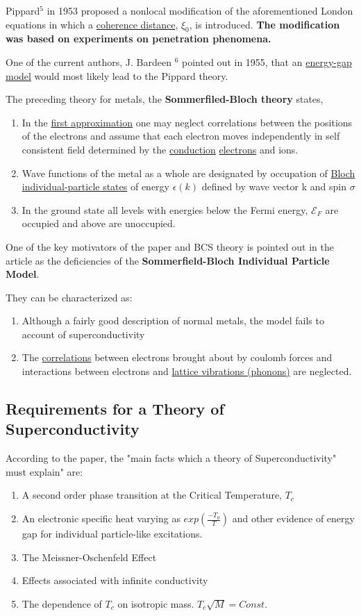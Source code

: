 \documentclass[11pt,letterpaper]{article}
\begin{document}
Pippard$^5$ in 1953 proposed a nonlocal modification of the aforementioned London equations in which a \underline{coherence distance}, $\xi_{0}$, is introduced. \textbf{The modification was based on experiments on penetration phenomena.}

One of the current authors, J. Bardeen $^6$ pointed out in 1955, that an \underline{energy-gap model} would most likely lead to the Pippard theory.

The preceding theory for metals, the \textbf{Sommerfiled-Bloch theory} states,
\begin{enumerate}[i]
    \item In the \underline{first approximation} one may neglect correlations between the positions of the electrons and assume that each electron moves independently in self consistent field determined by the \underline{conduction} \underline{electrons} and ions.

    \item Wave functions of the metal as a whole are designated by occupation of \underline{Bloch individual-particle states} of energy $\epsilon(k)$ defined by wave vector k and spin $\sigma$
    \item In the ground state all levels with energies below the Fermi energy, $\mathscr{E}_F$ are occupied and above are unoccupied.
\end{enumerate}
One of the key motivators of the paper and BCS theory is pointed out in the article as the deficiencies of the \textbf{Sommerfield-Bloch Individual Particle Model}.

They can be characterized as:
\begin{enumerate}[i]
    \item Although a fairly good description of normal metals, the model fails to account of superconductivity

    \item The \underline{correlations} between electrons brought about by coulomb forces and interactions between electrons and \underline{lattice vibrations (phonons)} are neglected.
\end{enumerate}

\subsection*{Requirements for a Theory of Superconductivity}
According to the paper, the "main facts which a theory of Superconductivity" must explain" are:
\begin{enumerate}
    \item A second order phase transition at the Critical Temperature, $T_{c}$
    \item An electronic specific heat varying as $exp({\frac{-T_0}{T}})$ and other evidence of energy gap for individual particle-like excitations.
    \item The Meissner-Oschenfeld Effect
    \item Effects associated with infinite conductivity
    \item The dependence of $T_c$ on isotropic mass. $T_c\sqrt{M} = Const.$
\end{enumerate}
\end{document}

